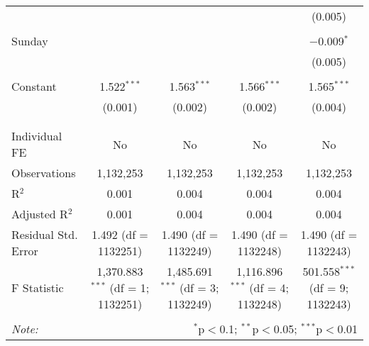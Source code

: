 \documentclass[
]{article}
\begin{document}
\begin{table}[!htbp]
{\begin{tabular}{@{\extracolsep{5pt}}lcccc}
  &  &  &  & (0.005) \\ 
  & & & & \\ 
 Sunday &  &  &  & $-$0.009$^{*}$ \\ 
  &  &  &  & (0.005) \\ 
  & & & & \\ 
 Constant & 1.522$^{***}$ & 1.563$^{***}$ & 1.566$^{***}$ & 1.565$^{***}$ \\ 
  & (0.001) & (0.002) & (0.002) & (0.004) \\ 
  & & & & \\ 
\hline \\[-1.8ex] 
Individual FE & No & No & No & No \\ 
Observations & 1,132,253 & 1,132,253 & 1,132,253 & 1,132,253 \\ 
R$^{2}$ & 0.001 & 0.004 & 0.004 & 0.004 \\ 
Adjusted R$^{2}$ & 0.001 & 0.004 & 0.004 & 0.004 \\ 
Residual Std. Error & 1.492 (df = 1132251) & 1.490 (df = 1132249) & 1.490 (df = 1132248) & 1.490 (df = 1132243) \\ 
F Statistic & 1,370.883$^{***}$ (df = 1; 1132251) & 1,485.691$^{***}$ (df = 3; 1132249) & 1,116.896$^{***}$ (df = 4; 1132248) & 501.558$^{***}$ (df = 9; 1132243) \\ 
\hline 
\hline \\[-1.8ex] 
\textit{Note:}  & \multicolumn{4}{r}{$^{*}$p$<$0.1; $^{**}$p$<$0.05; $^{***}$p$<$0.01} \\ 
\end{tabular}
} 
\end{table} 
\newpage
\end{document}

